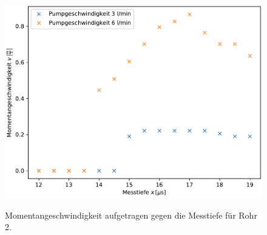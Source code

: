 \begin{figure}[H]
    \centering
    \caption{Momentangeschwindigkeit aufgetragen gegen die Messtiefe für Rohr 2.}
    \includegraphics[width=0.82\linewidth]{plot4.pdf}
    \label{fig:Momentan_2}
\end{figure}
                                            
